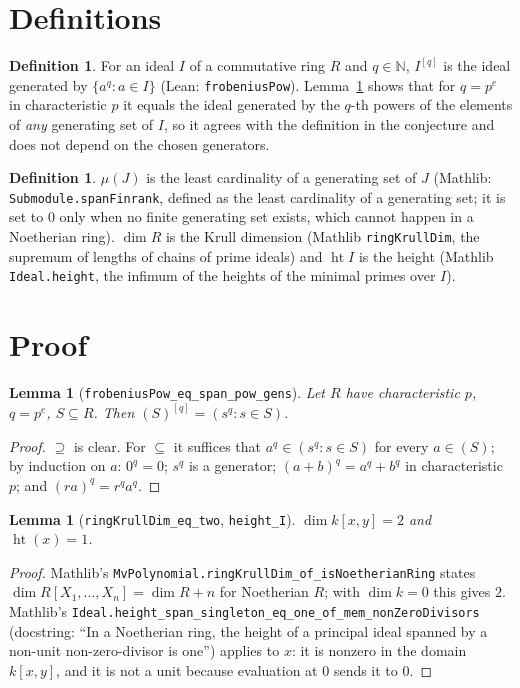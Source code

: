 \documentclass[11pt]{article}
\newtheorem{lemma}[theorem]{Lemma}
\theoremstyle{definition}
\newtheorem{definition}[theorem]{Definition}
\begin{document}
\section{Definitions}
\begin{definition}
For an ideal $I$ of a commutative ring $R$ and $q\in\mathbb N$, $I^{[q]}$ is the ideal generated by
$\{a^q : a\in I\}$ (Lean: \texttt{frobeniusPow}). Lemma~\ref{lem:gens} shows that for $q=p^e$ in
characteristic $p$ it equals the ideal generated by the $q$-th powers of the elements of \emph{any}
generating set of $I$, so it agrees with the definition in the conjecture and does not depend on the
chosen generators.
\end{definition}
\begin{definition}
$\mu(J)$ is the least cardinality of a generating set of $J$ (Mathlib: \texttt{Submodule.spanFinrank},
defined as the least cardinality of a generating set; it is set to $0$ only when no finite generating
set exists, which cannot happen in a Noetherian ring).
$\dim R$ is the Krull dimension (Mathlib \texttt{ringKrullDim}, the supremum of lengths of chains of
prime ideals) and $\operatorname{ht} I$ is the height (Mathlib \texttt{Ideal.height}, the infimum of the
heights of the minimal primes over $I$).
\end{definition}

\section{Proof}
\begin{lemma}[\texttt{frobeniusPow\_eq\_span\_pow\_gens}]\label{lem:gens}
Let $R$ have characteristic $p$, $q=p^e$, $S\subseteq R$. Then $(S)^{[q]}=(s^q : s\in S)$.
\end{lemma}
\begin{proof}
$\supseteq$ is clear. For $\subseteq$ it suffices that $a^q\in(s^q:s\in S)$ for every $a\in(S)$; by
induction on $a$: $0^q=0$; $s^q$ is a generator; $(a+b)^q=a^q+b^q$ in characteristic $p$; and
$(ra)^q=r^qa^q$.
\end{proof}

\begin{lemma}[\texttt{ringKrullDim\_eq\_two}, \texttt{height\_I}]
$\dim k[x,y]=2$ and $\operatorname{ht}(x)=1$.
\end{lemma}
\begin{proof}
Mathlib's \texttt{MvPolynomial.ringKrullDim\_of\_isNoetherianRing} states
$\dim R[X_1,\dots,X_n]=\dim R+n$ for Noetherian $R$; with $\dim k=0$ this gives $2$.
Mathlib's \texttt{Ideal.height\_span\_singleton\_eq\_one\_of\_mem\_nonZeroDivisors} (docstring: ``In a
Noetherian ring, the height of a principal ideal spanned by a non-unit non-zero-divisor is one'')
applies to $x$: it is nonzero in the domain $k[x,y]$, and it is not a unit because evaluation at $0$
sends it to $0$.
\end{proof}
\end{document}

